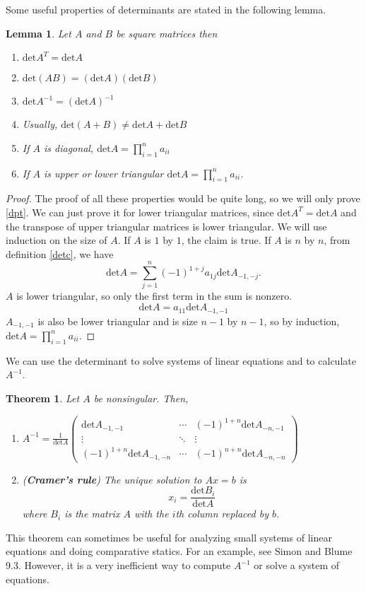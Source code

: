 \documentclass[12pt,reqno]{amsart}
\renewcommand{\det}{\mathrm{det}}
\newtheorem{theorem}{Theorem}[section]
\newtheorem{lemma}{Lemma}[section]
\theoremstyle{definition}
\begin{document}
Some useful properties of determinants are stated in the following lemma.
\begin{lemma}\label{lem:detprop}
  Let $A$ and $B$ be square matrices then
  \begin{enumerate}
  \item $\det A^T = \det A$
  \item $\det (AB) = (\det A) (\det B)$
  \item $\det A^{-1} = (\det A)^{-1}$
  \item Usually, $\det(A + B) \neq \det A + \det B$
  \item If $A$ is diagonal, $\det A = \prod_{i=1}^n a_{ii}$
  \item\label{dpt} If $A$ is upper or lower triangular $\det A = \prod_{i=1}^n
    a_{ii}$.  
  \end{enumerate}
\end{lemma}
\begin{proof}
  The proof of all these properties would be quite long, so we will
  only prove \ref{dpt}. We can just prove it for lower triangular
  matrices, since $\det A^T = \det A$ and the transpose of upper
  triangular matrices is lower triangular. We will use induction on
  the size of $A$. If $A$ is $1$ by $1$, the claim is true. If $A$ is
  $n$ by $n$, from definition \ref{detc},
  we have
  \[ \det A = \sum_{j=1}^n (-1)^{1+j} a_{1j} \det A_{-1,-j}. \]
  $A$ is lower triangular, so only the first term in the sum is
  nonzero.
  \[ \det A = a_{11} \det A_{-1,-1} \]
  $A_{-1,-1}$ is also be lower triangular and is size $n-1$ by $n-1$,
  so by induction, $\det A = \prod_{i=1}^n a_{ii}$. 
\end{proof}

We can use the determinant to solve systems of linear equations and to
calculate $A^{-1}$. 
\begin{theorem}
  Let $A$ be nonsingular. Then,
  \begin{enumerate}
  \item $A^{-1} = \frac{1}{\det A} \begin{pmatrix} 
      \det A_{-1,-1} & \cdots & (-1)^{1+n} \det A_{-n,-1} \\
      \vdots & \ddots & \vdots \\
      (-1)^{1+n} \det A_{-1,-n} & \cdots & (-1)^{n+n} \det A_{-n,-n} 
    \end{pmatrix}$
  \item (\textbf{Cramer's rule}) The unique solution to $A x = b$ is 
    \[ x_i = \frac{\det B_i}{\det A} \]
    where $B_i$ is the matrix $A$ with the $i$th column replaced by
    $b$. 
  \end{enumerate}
\end{theorem}
This theorem can sometimes be useful for analyzing small systems of
linear equations and doing comparative statics. For an example, see
Simon and Blume 9.3. However, it is a very inefficient way to compute
$A^{-1}$ or solve a system of equations. 
\end{document}
